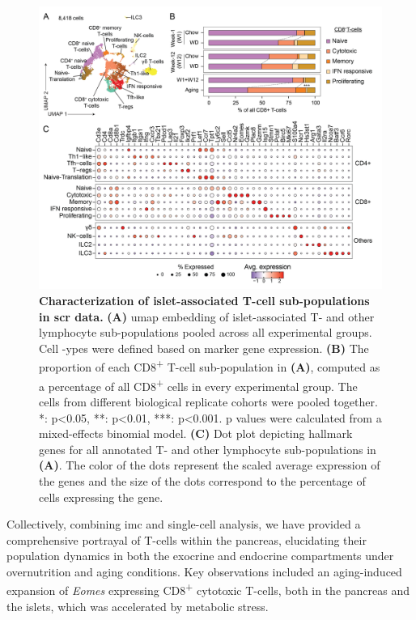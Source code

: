 \begin{figure}[t!]
\centering
\includegraphics[width=\linewidth]{Chapter4/Fig/F2-10-01.png}
\caption[Characterization of T-cell sub-populations in  data]{\textbf{Characterization of islet-associated T-cell sub-populations in \gls{scr} data.} \textbf{(A)} \gls{umap} embedding of islet-associated T- and other lymphocyte sub-populations pooled across all experimental groups. Cell -ypes were defined based on marker gene expression. \textbf{(B)} The proportion of each CD8\textsuperscript{+} T-cell sub-population in \textbf{(A)}, computed as a percentage of all CD8\textsuperscript{+} cells in every experimental group. The cells from different biological replicate cohorts were pooled together. *: p<0.05, **: p<0.01, ***: p<0.001. p values were calculated from a mixed-effects binomial model. \textbf{(C)} Dot plot depicting hallmark genes for all annotated T- and other lymphocyte sub-populations in \textbf{(A)}. The color of the dots represent the scaled average expression of the genes and the size of the dots correspond to the percentage of cells expressing the gene.
}
\label{fig:chp2_scrna_tcells1}
\end{figure}

\par Collectively, combining \gls{imc} and single-cell analysis, we have provided a comprehensive portrayal of T-cells within the pancreas, elucidating their population dynamics in both the exocrine and endocrine compartments under overnutrition and aging conditions. Key observations included an aging-induced expansion of \textit{Eomes} expressing CD8\textsuperscript{+} cytotoxic T-cells, both in the pancreas and the islets, which was accelerated by metabolic stress.

